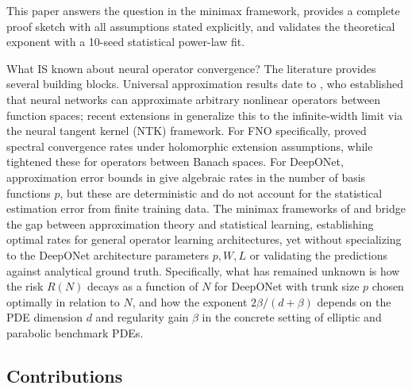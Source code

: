 \documentclass[12pt,a4paper]{article}
\begin{document}
This paper answers the question in the minimax framework, provides a
complete proof sketch with all assumptions stated explicitly,
and validates the theoretical exponent with a 10-seed statistical power-law fit.

What IS known about neural operator convergence?  The literature provides
several building blocks.  Universal approximation results date to
\citet{chen1995universal}, who established that neural networks can approximate
arbitrary nonlinear operators between function spaces; recent extensions in
\citet{kovachki2023neuralop} generalize this to the infinite-width limit via
the neural tangent kernel (NTK) framework.  For FNO specifically,
\citet{kovachki2021fno} proved spectral convergence rates under holomorphic
extension assumptions, while \citet{lanthaler2024holomorphic} tightened these
for operators between Banach spaces.  For DeepONet, approximation error bounds
in \citet{deng2022deeponet,lu2022error} give algebraic rates in the number of
basis functions $p$, but these are deterministic and do not account for the
statistical estimation error from finite training data.  The minimax frameworks
of \citet{bouchard2023minimax} and \citet{brugiapaglia2026tour} bridge the gap
between approximation theory and statistical learning, establishing optimal
rates for general operator learning architectures, yet without specializing to
the DeepONet architecture parameters $p, W, L$ or validating the predictions
against analytical ground truth.  Specifically, what has remained unknown is
how the risk $R(N)$ decays as a function of $N$ for DeepONet with trunk size $p$
chosen optimally in relation to $N$, and how the exponent $2\beta/(d+\beta)$
depends on the PDE dimension $d$ and regularity gain $\beta$ in the concrete
setting of elliptic and parabolic benchmark PDEs.

\subsection{Contributions}
\end{document}
